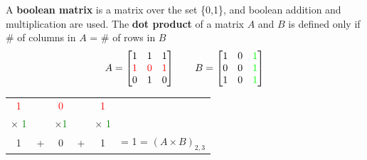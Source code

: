 A \textbf{boolean matrix} is a matrix over the set \{0,1\}, and boolean addition and multiplication are used.
The \textbf{dot product} of a matrix $A$ and $B$ is defined only if \# of columns in $A$ = \# of rows in $B$
\[
  A =
  \begin{bmatrix}
    1                       & 1                       & 1                       \\
    \text{\textcolor{red}1} & \text{\textcolor{red}0} & \text{\textcolor{red}1} \\
    0                       & 1                       & 0
  \end{bmatrix}
  \qquad
  B =
  \begin{bmatrix}
    1 & 0 & \text{\textcolor{green}1} \\
    0 & 0 & \text{\textcolor{green}1} \\
    1 & 0 & \text{\textcolor{green}1}
  \end{bmatrix}
\]
\begin{center}
  \begin{tabular}{cccccc}
    {\textcolor{red}1}            &   & {\textcolor{red}0}           &   & {\textcolor{red}1}                                         \\
    $\times$ {\textcolor{green}1} &   & $\times${\textcolor{green}1} &   & $\times$ {\textcolor{green}1}                              \\
    \hhline{-~-~-}
    1                             & + & 0                            & + & 1                             & = 1 = $(A \times B)_{2,3}$
  \end{tabular}
\end{center}

